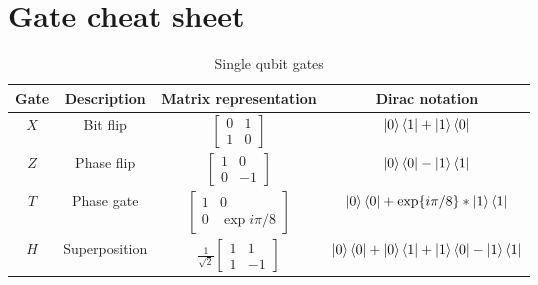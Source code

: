 \newpage
\section{Gate cheat sheet}

\begin{comment}
We now list some of the common gates mentioned throughout the rest of this guide, the Clifford plus T gates.
\end{comment}

\begin{table}[h]
    \centering
    \begin{tabular}{c|c|c|c}
        Gate & Description &  Matrix representation & Dirac notation \\ \hline
        $\boxed{X}$ & Bit flip 
        & $\begin{bmatrix} 0 & 1 \\ 1 & 0 \end{bmatrix}$ 
        & $\left\vert{0}\right\rangle\left\langle{1}\right\vert + \left\vert{1}\right\rangle\left\langle{0}\right\vert$\\
        $\boxed{Z}$ & Phase flip 
        & $\begin{bmatrix} 1 & 0 \\ 0 &-1 \end{bmatrix}$ 
        & $\left\vert{0}\right\rangle\left\langle{0}\right\vert - \left\vert{1}\right\rangle\left\langle{1}\right\vert $\\
        $\boxed{T}$ & Phase gate 
        & $\begin{bmatrix} 1 & 0 \\ 0 & \exp{i\pi/8} \end{bmatrix}$ 
        & $\left\vert{0}\right\rangle\left\langle{0}\right\vert + \exp{i\pi / 8 }*\left\vert{1}\right\rangle\left\langle{1}\right\vert $\\
        $\boxed{H}$ & Superposition 
        & $\frac{1}{\sqrt{2}} \begin{bmatrix} 1 & 1 \\ 1&-1 \end{bmatrix}$ 
        & $\left\vert{0}\right\rangle\left\langle{0}\right\vert + \left\vert{0}\right\rangle\left\langle{1}\right\vert + \left\vert{1}\right\rangle\left\langle{0}\right\vert - \left\vert{1}\right\rangle\left\langle{1}\right\vert $\\ 
    \end{tabular}
    \caption{Single qubit gates}
    \label{tab:singlequbitgates}
\end{table}

